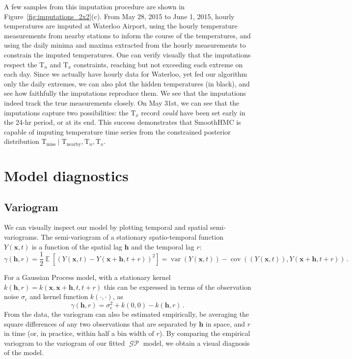 \documentclass[letter]{article}
\newcommand{\genericdel}[3]{%
      \left#1#3\right#2
    }
\newcommand{\del}[1]{\genericdel(){#1}}
\newcommand{\sbr}[1]{\genericdel[]{#1}}
\DeclareMathOperator{\E}{\mathbb{E}}
\DeclareMathOperator{\cov}{{cov}}
\DeclareMathOperator{\var}{{var}}
\DeclareMathOperator{\GP}{\mathcal{GP}}
\newcommand{\T}{\mathrm{T}}
\newcommand{\Tn}{\T_{n}}
\newcommand{\Tx}{\T_{x}}
\newcommand{\xvec}{\mathbold{x}}
\newcommand{\hvec}{\mathbold{h}}
\newcommand{\sigman}{\sigma_{\epsilon}}
\newcommand{\miss}{\mathrm{miss}}
\newcommand{\obs}{\mathrm{nearby}}
\begin{document}
        A few samples from this imputation procedure are shown in Figure~\ref{fig:imputations_2x2}(c).
From May 28, 2015 to June 1, 2015, hourly temperatures are imputed at Waterloo Airport, using the hourly temperature measurements from nearby stations to inform the course of the temperatures, and using the daily minima and maxima extracted from the hourly measurements to constrain the imputed temperatures.
One can verify visually that the imputations respect the \(\Tn\) and \(\Tx\) constraints, reaching but not exceeding each extreme on each day.
Since we actually have hourly data for Waterloo, yet fed our algorithm only the daily extremes, we can also plot the hidden temperatures (in black), and see how faithfully the imputations reproduce them.
We see that the imputations indeed track the true measurements closely.
On May 31st, we can see that the imputations capture two possibilities: the \(\Tx\) record \emph{could} have been set early in the 24-hr period, or at its end.
This success demonstrates that SmoothHMC is capable of imputing temperature time series from the constrained posterior distribution \(\T_\miss \mid \T_\obs, \Tn, \Tx\).
    


        \section{Model diagnostics}\label{model-diagnostics}

\subsection{Variogram}\label{variogram}

We can visually inspect our model by plotting temporal and spatial semi-variograms. The semi-variogram  of a stationary spatio-temporal function \(Y(\xvec,t)\) is a function of the spatial lag \(\hvec\) and the temporal lag \(r\)\citep[see for example][chapter 6]{sherman2011spatial}:
\begin{equation}
    \gamma\del{\hvec,r} = \frac{1}{2} \E\sbr{\del{Y\del{\xvec,t}-Y\del{\xvec+\hvec,t+r}}^2} = \var\del{ Y\del{\xvec,t}} - \cov\del{ \del{Y\del{\xvec,t}} , Y\del{\xvec+\hvec,t+r}}\,.
\end{equation}

For a Gaussian Process model, with a stationary kernel \(k(\hvec,r)=k(\xvec,\xvec+\hvec,t,t+r)\) this can be expressed in terms of the observation noise \(\sigman\) and kernel function \(k(\cdot,\cdot)\), as
\begin{equation}
    \label{eq:gp_variogram}
    \gamma\del{\hvec,r} = \sigman^2 + k\del{0,0} - k(\hvec,r)\,.
\end{equation}
From the data, the variogram can also be estimated empirically, be averaging the square differences of any two observations that are separated by \(\hvec\) in space, and \(r\) in time (or, in practice, within half a bin width of \(r\)).
By comparing the empirical variogram to the variogram of our fitted \(\GP\) model, we obtain a visual diagnosis of the model.
\end{document}

